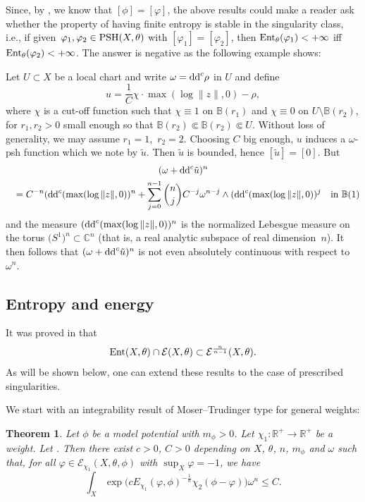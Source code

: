 \documentclass[pdftex]{sigma}
\numberwithin{equation}{section}
\newtheorem{Theorem}{Theorem}[section]
\theoremstyle{plain}
\newcommand{\R}{\mathbb R}
\newcommand{\C}{\mathbb C}
\newcommand \PSH {{\rm PSH}}
\newcommand \Ent{{\rm Ent}}
\newcommand \cE{\mathcal E }
\begin{document}
Since, by \cite[Theorem 5.19]{DDL6}, we know that $[\phi]=[\varphi]$, the above results could make a reader ask whether the property of having finite entropy is stable in the singularity class, i.e., if given~${\varphi_1,\varphi_2\in \PSH(X,\theta)}$ with $[\varphi_1]=[\varphi_2]$, then $\Ent_\theta(\varphi_1)<+\infty$ iff $\Ent_\theta(\varphi_2)<+\infty$. The answer is negative as the following example shows:

 \begin{Example} \label{exa: No Ent}
Let $U\subset X$ be a local chart and write $\omega={\rm dd}^c \rho$ in $U$ and define
\[u= \frac{1}{C } \chi \cdot \max(\log \|z\|, 0)-\rho,\]
where $\chi$ is a cut-off function such that $\chi\equiv 1$ on $\mathbb{B}(r_1)$ and $\chi\equiv 0 $ on $U\setminus \mathbb{B}(r_2)$, for $r_1, r_2>0$ small enough so that $\mathbb{B}(r_2)\Subset \mathbb{B}(r_2)\Subset U$. Without loss of generality, we may assume $r_1=1$,~$r_2=2$.
Choosing $C$ big enough, $u$ induces a $\omega$-psh function which we note by $\tilde{u}$.
Then $\tilde{u}$ is bounded, hence $[\tilde{u}]=[0]$. But
\begin{gather*}
(\omega+{\rm dd}^c \tilde{u})^n \\
\quad= C^{-n} ({\rm dd}^c (\max(\log \|z\|, 0))^n + \sum_{j=0}^{n-1} \binom{n}{j} C^{-j} \omega^{n-j} \wedge ({\rm dd}^c (\max(\log \|z\|, 0))^j \quad \text{in $\mathbb{B}(1)$}
\end{gather*}
and the measure $({\rm dd}^c (\max(\log \|z\|, 0))^n$ is the normalized Lebesgue measure on the torus $\big(S^1\big)^n\!\subset \C^n$ (that is, a real analytic subspace of real dimension~$n$). It then follows that $(\omega+{\rm dd}^c \tilde{u})^n$ is not even absolutely continuous with respect to $\omega^n$.
 \end{Example}

\subsection{Entropy and energy}
It was proved in \cite{DGL20, DNL21} that \[\Ent(X,\theta)\cap \mathcal{E}(X,\theta) \subset \cE^{\frac{n}{n-1}}(X,\theta).\] As will be shown below, one can extend these results to the case of prescribed singularities.

We start with an integrability result of Moser--Trudinger type for general weights:

\begin{Theorem}
 	\label{thm: rel Moser--Trudinger inequality weight}
 	Let $\phi$ be a model potential with $m_\phi>0$. Let $\chi_1\colon \R^+\rightarrow \R^+ $ be a weight. Let . Then there exist $c>0$, $C>0$ depending on $X$, $\theta$, $n$, $m_\phi$ and $\omega$ such that, for all $\varphi\in \mathcal{E}_{\chi_1}(X,\theta, \phi)$ with $\sup_X \varphi=-1$, we have
 	\begin{equation}
 	\int_X \exp \big( c E_{\chi_1}(\varphi, \phi)^{-\frac{1}{n}} \chi_2(\phi-\varphi)\big)\omega^n \leq C.
 	\label{eq: Moser} \end{equation}
 \end{Theorem}
\end{document}

